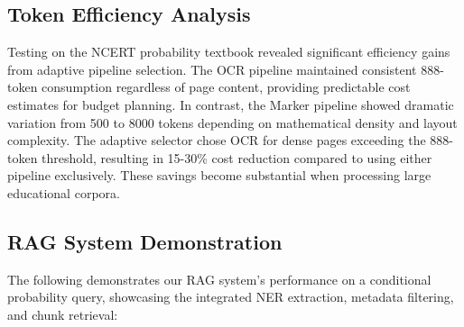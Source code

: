 \documentclass[12pt]{article}
\begin{document}
\subsection{Token Efficiency Analysis}

Testing on the NCERT probability textbook revealed significant efficiency gains from adaptive pipeline selection. The OCR pipeline maintained consistent 888-token consumption regardless of page content, providing predictable cost estimates for budget planning. In contrast, the Marker pipeline showed dramatic variation from 500 to 8000 tokens depending on mathematical density and layout complexity. The adaptive selector chose OCR for dense pages exceeding the 888-token threshold, resulting in 15-30\% cost reduction compared to using either pipeline exclusively. These savings become substantial when processing large educational corpora.

\subsection{RAG System Demonstration}

The following demonstrates our RAG system's performance on a conditional probability query, showcasing the integrated NER extraction, metadata filtering, and chunk retrieval:
\end{document}
